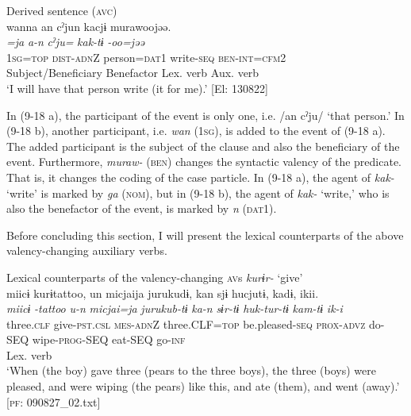   \ex  Derived sentence (\textsc{avc})\label{ex:9.18b}\\
      \gllll wanna  {an  cˀjun}  kacjɨ   murawoojəə.\\
      \textit{=ja}  {\textit{a-n}  \textit{cˀju=}}  \textit{kak-tɨ}      \textit{-oo=jəə}\\
      1\textsc{sg}=\textsc{top}  {\textsc{dist}-\textsc{adn}Z  person=\textsc{dat}1}  write-\textsc{seq}   \textsc{ben}-\textsc{int}=\textsc{cfm}2\\
      {Subject/Beneficiary} {Benefactor}  {Lex. verb} {Aux. verb} \\      
      \glt ‘I will have that person write (it for me).’       [El: 130822]
    \z
\z

In (9-18 a), the participant of the event is only one, i.e. /an cˀju/ ‘that person.’ In (9-18 b), another participant, i.e. \textit{wan} (1\textsc{sg}), is added to the event of (9-18 a). The added participant is the subject of the clause and also the beneficiary of the event. Furthermore, \textit{muraw-} (\textsc{ben}) changes the syntactic valency of the predicate. That is, it changes the coding of the case particle. In (9-18 a), the agent of \textit{kak-} ‘write’ is marked by \textit{ga} (\textsc{nom}), but in (9-18 b), the agent of \textit{kak-} ‘write,’ who is also the benefactor of the event, is marked by \textit{n} (\textsc{dat}1).

  Before concluding this section, I will present the lexical counterparts of the above valency-changing auxiliary verbs.

\ea   Lexical counterparts of the valency-changing \textsc{av}s \label{ex:9.19}
\ea \textit{kurɨr-} ‘give’\\
   \gllll miicɨ  kurɨtattoo,  un  micjaija  jurukudɨ, kan  sjɨ  hucjutɨ,  kadɨ,  ikii.\\
    \textit{miicɨ}  \textit{-tattoo}  \textit{u-n}  \textit{micjai=ja}  \textit{jurukub-tɨ}  \textit{ka-n}  \textit{sɨr-tɨ}  \textit{huk-tur-tɨ}  \textit{kam-tɨ}  \textit{ik-i}\\
    three.\textsc{clf}  give-\textsc{pst}.\textsc{csl}  \textsc{mes}-\textsc{adn}Z  three.CLF=\textsc{top}  be.pleased-\textsc{seq}  \textsc{prox}-\textsc{advz}  do-SEQ  wipe-\textsc{prog}-SEQ  eat-SEQ  go-\textsc{inf}\\
     {} {Lex. verb}    \\
    \glt  ‘When (the boy) gave three (pears to the three boys), the three (boys) were pleased, and were wiping (the pears) like this, and ate (them), and went (away).’   [\textsc{pf}: 090827\_02.txt]

